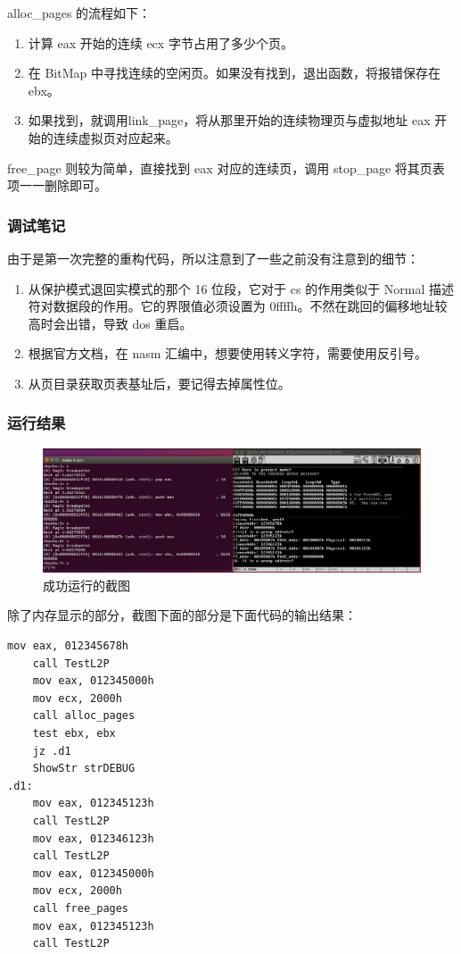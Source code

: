 \documentclass[UTF8,12pt]{ctexart}
\begin{document}
    alloc\_pages 的流程如下：
    \begin{enumerate}
        \item 计算 eax 开始的连续 ecx 字节占用了多少个页。
        \item 在 BitMap 中寻找连续的空闲页。如果没有找到，退出函数，将报错保存在 ebx。
        \item 如果找到，就调用link\_page，将从那里开始的连续物理页与虚拟地址 eax 开始的连续虚拟页对应起来。
    \end{enumerate}
    
    free\_page 则较为简单，直接找到 eax 对应的连续页，调用 stop\_page 将其页表项一一删除即可。
    
    \subsubsection{调试笔记}
    由于是第一次完整的重构代码，所以注意到了一些之前没有注意到的细节：
    \begin{enumerate}
        \item 从保护模式退回实模式的那个 16 位段，它对于 cs 的作用类似于 Normal 描述符对数据段的作用。它的界限值必须设置为 0ffffh。不然在跳回的偏移地址较高时会出错，导致 dos 重启。
        \item 根据官方文档，在 nasm 汇编中，想要使用转义字符，需要使用反引号。
        \item 从页目录获取页表基址后，要记得去掉属性位。
    \end{enumerate}
    
    \subsubsection{运行结果}
    \begin{figure}[H]
        \centering
        \includegraphics[width=12cm]{images/成功截图.png}
        \caption{成功运行的截图}
        \label{fig:my_label}
    \end{figure}
    
    除了内存显示的部分，截图下面的部分是下面代码的输出结果：
    \begin{lstlisting}[language={[x86masm]Assembler}]
    mov eax, 012345678h
    call TestL2P
    mov eax, 012345000h
    mov ecx, 2000h
    call alloc_pages
    test ebx, ebx
    jz .d1
    ShowStr strDEBUG
.d1:
    mov eax, 012345123h
    call TestL2P
    mov eax, 012346123h
    call TestL2P
    mov eax, 012345000h
    mov ecx, 2000h
    call free_pages
    mov eax, 012345123h
    call TestL2P
    \end{lstlisting}
    
\end{document}
